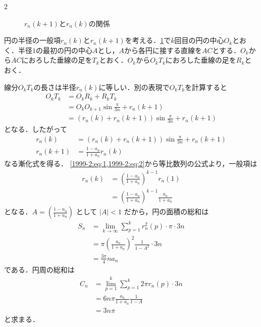 \documentclass[../../main.tex]{subfiles}
\begin{document}
\begin{multicols}{2}
\begin{figure}[H]
\begin{tikzpicture}[scale=2]
    \end{tikzpicture}
    \caption{$r_n(k+1)$と$r_{n}(k)$の関係}
    \label{1999-2:fig:3}
  \end{figure}

  円の半径の一般項$r_n(k)$と$r_n(k+1)$を考える．\cref{1999-2:fig:3}で$k$回目の円の中心$O_k$とおく．半径$1$の最初の円の中心$A$とし，$A$から各円に接する直線を$AC$とする．$O_k$から$AC$におろした垂線の足を$T_k$とおく．$O_k$から$O_kT_k$におろした垂線の足を$R_k$とおく．

  線分$O_kT_k$の長さは半径$r_n(k)$に等しい．別の表現で$O_kT_k$を計算すると
  \begin{align*}
    O_kT_k
     & = O_kR_k + R_kT_k                                           \\
     & = O_kO_{k+1}\sin\frac{\pi}{3n} + r_n(k+1)                   \\
     & = \left(r_n(k)+r_n(k+1)\right)\sin\frac{\pi}{3n} + r_n(k+1)
  \end{align*}
  となる．したがって
  \begin{align*}
    r_n(k)   & = \left(r_n(k)+r_n(k+1)\right)\sin\frac{\pi}{3n} + r_n(k+1) \\
    r_n(k+1) & = \frac{1-a_n}{1+a_n}r_n(k) \label{1999-2:eq:2}
  \end{align*}
  なる漸化式を得る．
  \cref{1999-2:eq:1,1999-2:eq:2}から等比数列の公式より，一般項は
  \begin{align}
    r_n(k)
     & = \left(\frac{1-a_n}{1+a_n}\right)^{k-1} r_n(1)           \\
     & = \left(\frac{1-a_n}{1+a_n}\right)^{k-1}\frac{a_n}{1+a_n}
  \end{align}
  となる．$A = \left(\frac{1-a_n}{1+a_n}\right)$ として $|A|<1$ だから，円の面積の総和は
  \begin{align}
    S_n
     & = \lim_{k \to \infty} \sum_{p=1}^{k} r^2_n(p) \cdot \pi \cdot 3n \\
     & = \pi \left(\frac{a_n}{1+a_n}\right)^2 \frac{1}{1-A^2} \cdot 3n  \\
     & = \frac{3\pi}{4} n a_n  \label{1999-2:eq:3}
  \end{align}
  である．円周の総和は
  \begin{align}
    C_n
     & = \lim_{p=1}^{k} \sum_{p=1}^{k} 2\pi r_n(p) \cdot 3n \\
     & = 6n\pi \frac{a_n}{1+a_n} \frac{1}{1-A}              \\
     & = 3n\pi \label{1999-2:eq:4}
  \end{align}
  と求まる．


\end{multicols}
\end{document}
